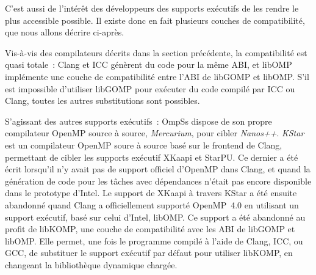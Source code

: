 C'est aussi de l'intérêt des développeurs des supports exécutifs de les rendre le plus accessible possible.
Il existe donc en fait plusieurs couches de compatibilité, que nous allons décrire ci-après.

Vis-à-vis des compilateurs décrits dans la section précédente, la compatibilité est quasi totale~: Clang et ICC génèrent du code pour la même ABI, et libOMP implémente une couche de compatibilité entre l'ABI de libGOMP et libOMP.
S'il est impossible d'utiliser libGOMP pour exécuter du code compilé par ICC ou Clang, toutes les autres substitutions sont possibles.

S'agissant des autres supports exécutifs~: OmpSs dispose de son propre compilateur OpenMP source à source, \emph{Mercurium}, pour cibler \emph{Nanos++}.
\emph{KStar} est un compilateur OpenMP soure à source basé sur le frontend de Clang, permettant de cibler les supports exécutif XKaapi et StarPU.
Ce dernier a été écrit lorsqu'il n'y avait pas de support officiel d'OpenMP dans Clang, et quand la génération de code pour les tâches avec dépendances n'était pas encore disponible dans le prototype d'Intel.
Le support de XKaapi à travers KStar a été ensuite abandonné quand Clang a officiellement supporté OpenMP~4.0 en utilisant un support exécutif, basé sur celui d'Intel, libOMP.
Ce support a été abandonné au profit de libKOMP, une couche de compatibilité avec les ABI de libGOMP et libOMP.
Elle permet, une fois le programme compilé à l'aide de Clang, ICC, ou GCC, de substituer le support exécutif par défaut pour utiliser libKOMP, en changeant la bibliothèque dynamique chargée.
